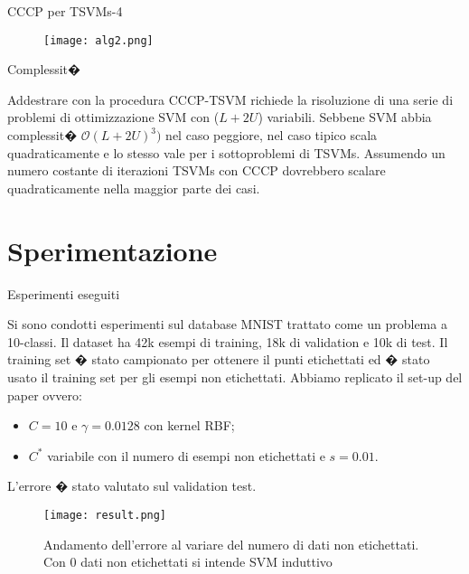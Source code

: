 \documentclass[mathserif]{beamer}
\begin{document}
\begin{frame}{CCCP per TSVMs-4}
\begin{figure}[htbp]
	\centering
		\texttt{[image: alg2.png]}
	\label{fig:gres}
\end{figure}
\end{frame}

\begin{frame}{Complessit�}
\begin{block}{}
Addestrare con la procedura CCCP-TSVM richiede la risoluzione di una serie di problemi di ottimizzazione SVM con ($L+2U$) variabili. Sebbene SVM abbia complessit� $ \mathcal{O} (L+2U)^3)$ nel caso peggiore, nel caso tipico scala quadraticamente e lo stesso vale per i sottoproblemi di TSVMs. Assumendo un numero costante di iterazioni TSVMs con CCCP dovrebbero scalare quadraticamente nella maggior parte dei casi.
\end{block}
\end{frame}


\section{Sperimentazione}

\begin{frame}{Esperimenti eseguiti}
\begin{block}{}
Si sono condotti esperimenti sul database MNIST trattato come un problema a 10-classi. Il dataset ha 42k esempi di training, 18k di validation e 10k di test. Il training set � stato campionato per ottenere il punti etichettati ed � stato usato il training set per gli esempi non etichettati. Abbiamo replicato il set-up del paper ovvero:
\begin{itemize}
	\item <1-> $C=10$ e $\gamma = 0.0128$ con kernel RBF;
	\item <1-> $C^*$ variabile con il numero di esempi non etichettati e $s=0.01$.
\end{itemize}
L'errore � stato valutato sul validation test.
\end{block}
\end{frame}

\begin{frame}
\begin{figure}[htbp]
	\centering
		\texttt{[image: result.png]}
	\caption{Andamento dell'errore al variare del numero di dati non etichettati. Con $0$ dati non etichettati si intende SVM induttivo}
	\label{fig:gres}
\end{figure}
\end{frame}
\end{document}
